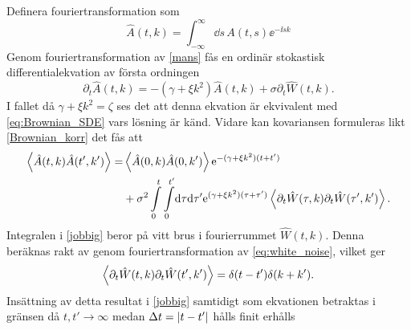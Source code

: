 Definera fouriertransformation som 
\begin{equation}
    \hat{A}(t,k)=\int_{-\infty}^{\infty}\!\dd{s}\, A(t,s)\ee^{-\ii sk}
\end{equation}
Genom fouriertransformation av \eqref{mans} fås en ordinär stokastisk differentialekvation av första ordningen
\begin{equation}
        \partial_{t}\hat{A}(t,k)=-\left(\gamma+\xi k^2\right)\hat{A}(t,k)+\sigma \partial_{t}\hat{W}(t,k).
\end{equation}
I fallet då $\gamma+\xi k^2=\zeta$ ses det att denna ekvation är ekvivalent med \eqref{eq:Brownian_SDE} vars lösning är känd. Vidare kan kovariansen formuleras likt \eqref{Brownian_korr} det fås att
\begin{equation}\label{jobbig}
\begin{aligned}
    \ev{\hat{A}(t,k)\hat{A}(t',k')} =& \ev{\hat{A}(0,k)\hat{A}(0,k')} \ee^{-(\gamma+\xi k^2)(t+t')}\\ 
    &+ \sigma^2 \int_{0}^{t}\int_{0}^{t'}\!\dd\tau\dd\tau' \ee^{(\gamma+\xi k^2)(\tau+\tau')} \ev{\partial_{t}\hat{W}(\tau,k)\partial_{t}\hat{W}(\tau',k')}.
\end{aligned}
\end{equation}
Integralen i \eqref{jobbig} beror på vitt brus i fourierrummet $\hat{W}(t,k)$. Denna beräknas rakt av genom fouriertransformation av \eqref{eq:white_noise}, vilket ger
\begin{equation}
    \ev{\partial_{t}\hat{W}(t,k)\partial_{t}\hat{W}(t',k')}=\delta(t-t')\delta(k+k').
\end{equation}
Insättning av detta resultat i \eqref{jobbig} samtidigt som ekvationen betraktas i gränsen då $t,t'\rightarrow\infty$ medan $\Delta t=\abs{t-t'}$ hålls finit erhålls

